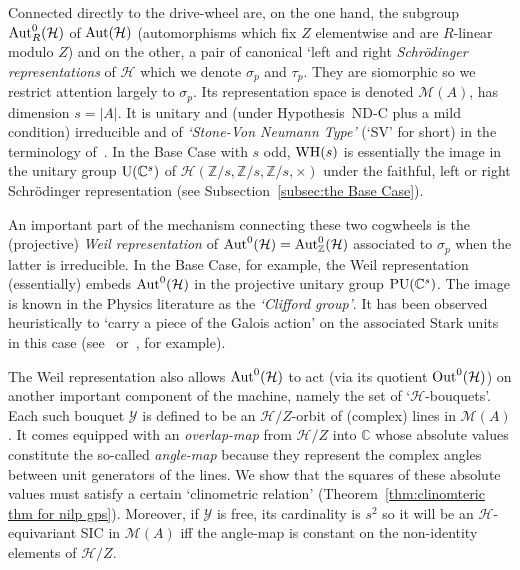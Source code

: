 \documentclass[12pt]{article}
\newcounter{example}[section]
\newcommand{\Aut}{{\rm Aut}}
\newcommand{\bbC}{\ensuremath{\mathbb{C}}}\newcommand{\bbCp}{\ensuremath{\mathbb{C}_p}}
\newcommand{\bbZ}{\ensuremath{\mathbb{Z}}}
\newcommand{\cH}{\ensuremath{\mathcal{H}}}
\newcommand{\cM}{\mathcal{M}}
\newcommand{\cY}{\ensuremath{\mathcal{Y}}}
\newcommand{\Out}{{\rm Out}}
\newcommand{\Zover}[1]{\ensuremath{\bbZ/#1}}
\begin{document}
Connected directly to the drive-wheel are, on the one hand, the subgroup $\Aut_R^0(\cH)$ of $\Aut(\cH)$ (automorphisms which fix $Z$ elementwise and are $R$-linear modulo $Z$) and on the other, a pair of canonical `left and right \textit{Schr\"odinger representations} of $\cH$ which we denote $\sigma_p$ and $\tau_p$. They are siomorphic so we restrict attention largely to $\sigma_p$. Its representation space is denoted $\cM(A)$, has dimension $s=|A|$. It is unitary and  (under Hypothesis~ND-C plus a mild condition) irreducible and of \textit{`Stone-Von Neumann Type'} (`SV' for short) in the terminology of~\cite{Howe}. In the Base Case with $s$ odd, ${\rm WH}(s)$ is essentially the image in the unitary group ${\rm U}(\bbC^s)$ of $\cH(\Zover{s},\Zover{s},\Zover{s}, \times)$ under the faithful, left or right Schr\"odinger representation (see Subsection~\ref{subsec:the Base Case}). 

An important part of the mechanism connecting these two cogwheels is the (projective) \textit{Weil representation} of $\Aut^0(\cH)=\Aut^0_\bbZ(\cH)$ associated to $\sigma_p$ when the latter is irreducible. In the Base Case, for example, the Weil representation (essentially) embeds $\Aut^0(\cH)$ in the projective unitary group ${\rm PU}(\bbC^s)$. The image is known in the Physics literature as the \textit{`Clifford group'}. It has been observed heuristically to `carry a piece of the Galois action' on the associated Stark units in this case (see~\cite[Ch.\ 14]{Waldron's book} or~\cite{ABGHM}, for example).


The Weil representation also allows $\Aut^0(\cH)$ to act (via its quotient $\Out^0(\cH)$) on another important component of the machine, namely the set of `$\cH$-bouquets'. Each such bouquet $\cY$ is defined to be an $\cH/Z$-orbit of (complex) lines in $\cM(A)$. It comes equipped with an \textit{overlap-map} from $\cH/Z$ into $\bbC$ whose absolute values constitute the so-called \textit{angle-map} because they represent the complex angles between unit generators of the  lines. We show that the squares of these absolute values must satisfy a certain `clinometric relation' (Theorem~\ref{thm:clinomteric thm for nilp gps}). Moreover, if $\cY$ is free, its cardinality is $s^2$ so it will be an $\cH$-equivariant SIC in $\cM(A)$ iff the angle-map is constant on the  non-identity elements of $\cH/Z$. 
\end{document}
